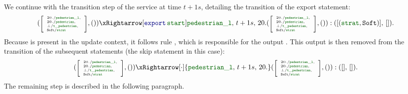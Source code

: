 We continue with the transition step of the  service at time $t + 1s$, detailing the
transition of the export statement:
\begin{equation*}
    (\mathtiny{\left[\begin{array}{l}
                20./\idf{pedestrian\_l},  \\
                20./\idf{pedestrian},     \\
                \bot/\idf{t\_pedestrian}, \\
                \Soft/\idf{strat}
            \end{array}\right]}, ())
    \xRightarrow[\export{\idf{start}}]{\idf{pedestrian\_l}, \, t+1s, \, 20.}
    (\mathtiny{\left[\begin{array}{l}
                20./\idf{pedestrian\_l},  \\
                20./\idf{pedestrian},     \\
                \bot/\idf{t\_pedestrian}, \\
                \Soft/\idf{strat}
            \end{array}\right]}, ()):
    ([(\idf{strat}, \Soft)], \, []).
\end{equation*}
%
Because  is present in the update context, it follows rule
, which is responsible for the output
. This output is then removed from the transition of the subsequent statements
(the skip statement \skp in this case):
\begin{equation*}
    (\mathtiny{\left[\begin{array}{l}
                20./\idf{pedestrian\_l},  \\
                20./\idf{pedestrian},     \\
                \bot/\idf{t\_pedestrian}, \\
                \Soft/\idf{strat}
            \end{array}\right]}, ())
    \xRightarrow[\skp]{\idf{pedestrian\_l}, \, t+1s, \, 20.}
    (\mathtiny{\left[\begin{array}{l}
                20./\idf{pedestrian\_l},  \\
                20./\idf{pedestrian},     \\
                \bot/\idf{t\_pedestrian}, \\
                \Soft/\idf{strat}
            \end{array}\right]}, ()):
    ([], \, []).
\end{equation*}
%
The remaining step is described in the following paragraph.

